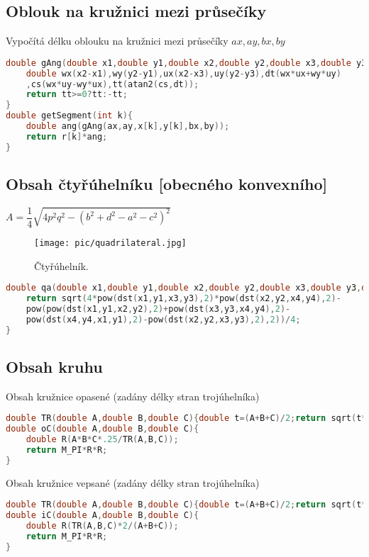 \documentclass[11pt]{article}
\begin{document}
\subsection{Oblouk na kružnici mezi průsečíky}
Vypočítá délku oblouku na kružnici mezi průsečíky $ax,ay,bx,by$
\begin{lstlisting}[language=C++]
double gAng(double x1,double y1,double x2,double y2,double x3,double y3){
    double wx(x2-x1),wy(y2-y1),ux(x2-x3),uy(y2-y3),dt(wx*ux+wy*uy)
    ,cs(wx*uy-wy*ux),tt(atan2(cs,dt));
    return tt>=0?tt:-tt;
}
double getSegment(int k){
    double ang(gAng(ax,ay,x[k],y[k],bx,by));
    return r[k]*ang;
}
\end{lstlisting}
\subsection{Obsah čtyřúhelníku [obecného konvexního]}
$A=\dfrac{1}{4}\sqrt{4p^2q^2-(b^2+d^2-a^2-c^2)^2}$
\begin{figure}[h]
  \centering
  \texttt{[image: pic/quadrilateral.jpg]}
  \caption[Čtyřúhelník.]{Čtyřúhelník.}
\end{figure}
\begin{lstlisting}[language=C++]
double qa(double x1,double y1,double x2,double y2,double x3,double y3,double x4,double y4){
    return sqrt(4*pow(dst(x1,y1,x3,y3),2)*pow(dst(x2,y2,x4,y4),2)-
    pow(pow(dst(x1,y1,x2,y2),2)+pow(dst(x3,y3,x4,y4),2)-
    pow(dst(x4,y4,x1,y1),2)-pow(dst(x2,y2,x3,y3),2),2))/4;
}
\end{lstlisting}
\subsection{Obsah kruhu}
Obsah kružnice opasené (zadány délky stran trojúhelníka)
\begin{lstlisting}[language=C++]
double TR(double A,double B,double C){double t=(A+B+C)/2;return sqrt(t*(t-A)*(t-B)*(t-C));}
double oC(double A,double B,double C){
    double R(A*B*C*.25/TR(A,B,C));
    return M_PI*R*R;
}
\end{lstlisting}
Obsah kružnice vepsané (zadány délky stran trojúhelníka)
\begin{lstlisting}[language=C++]
double TR(double A,double B,double C){double t=(A+B+C)/2;return sqrt(t*(t-A)*(t-B)*(t-C));}
double iC(double A,double B,double C){
    double R(TR(A,B,C)*2/(A+B+C));
    return M_PI*R*R;
}
\end{lstlisting}
\end{document}
